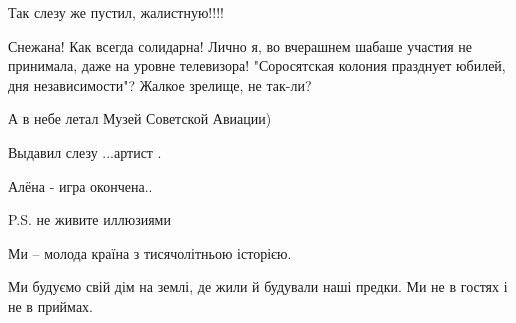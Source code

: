 \begin{itemize}
 
Так слезу же пустил, жалистную!!!!

 

Снежана! Как всегда солидарна! Лично я, во вчерашнем шабаше участия не
принимала, даже на уровне телевизора! "Соросятская колония празднует юбилей,
дня независимости"? Жалкое зрелище, не так-ли?


 
А в небе летал Музей Советской Авиации)

 
Выдавил слезу ...артист .

 

Алёна - игра окончена..

P.S. не живите иллюзиями

 

Ми – молода країна з тисячолітньою історією.

Ми будуємо свій дім на землі, де жили й будували наші предки. Ми не в гостях і
не в приймах.


\end{itemize}
